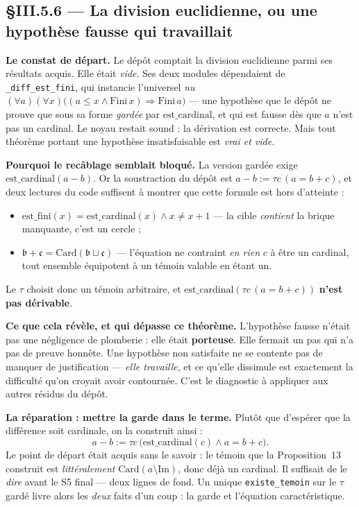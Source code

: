 \subsection{§III.5.6 --- La division euclidienne, ou une hypothèse fausse qui
travaillait}
\label{sec:iii5-division-reparee}

\textbf{Le constat de départ.} Le dépôt comptait la division euclidienne parmi
ses résultats acquis. Elle était \emph{vide}. Ses deux modules dépendaient de
\texttt{\_diff\_est\_fini}, qui instancie l'universel \emph{nu}
$(\forall a)(\forall x)\big((a \le x \wedge \mathrm{Fini}\,x) \Rightarrow
\mathrm{Fini}\,a\big)$ --- une hypothèse que le dépôt ne prouve que sous sa
forme \emph{gardée} par $\mathrm{est\_cardinal}$, et qui est fausse dès que $a$
n'est pas un cardinal. Le noyau restait sound : la dérivation est correcte. Mais
tout théorème portant une hypothèse insatisfaisable est \emph{vrai et vide}.

\textbf{Pourquoi le recâblage semblait bloqué.} La version gardée exige
$\mathrm{est\_cardinal}(a-b)$. Or la soustraction du dépôt est
$a - b := \tau c\,(a = b + c)$, et deux lectures du code suffisent à montrer que
cette formule est hors d'atteinte :
\begin{itemize}
\item $\mathrm{est\_fini}(x) = \mathrm{est\_cardinal}(x) \wedge x \neq x+1$ ---
la cible \emph{contient} la brique manquante, c'est un cercle ;
\item $\mathfrak{b} + \mathfrak{c} = \mathrm{Card}(\mathfrak{b} \sqcup
\mathfrak{c})$ --- l'équation ne contraint \emph{en rien} $c$ à être un
cardinal, tout ensemble équipotent à un témoin valable en étant un.
\end{itemize}
Le $\tau$ choisit donc un témoin arbitraire, et
$\mathrm{est\_cardinal}(\tau c\,(a = b+c))$ \textbf{n'est pas dérivable}.

\textbf{Ce que cela révèle, et qui dépasse ce théorème.} L'hypothèse fausse
n'était pas une négligence de plomberie : elle était \textbf{porteuse}. Elle
fermait un pas qui n'a pas de preuve honnête. Une hypothèse non satisfaite ne se
contente pas de manquer de justification --- \emph{elle travaille}, et ce
qu'elle dissimule est exactement la difficulté qu'on croyait avoir contournée.
C'est le diagnostic à appliquer aux autres résidus du dépôt.

\textbf{La réparation : mettre la garde dans le terme.} Plutôt que d'espérer que
la différence soit cardinale, on la construit ainsi :
\[
a - b := \tau c\,\big(\mathrm{est\_cardinal}(c) \wedge a = b + c\big).
\]
Le point de départ était acquis sans le savoir : le témoin que la Proposition~13
construit est \emph{littéralement} $\mathrm{Card}(a \setminus \mathrm{Im})$, donc
déjà un cardinal. Il suffisait de le \emph{dire} avant le S5 final --- deux
lignes de fond. Un unique \texttt{existe\_temoin} sur le $\tau$ gardé livre alors
les \emph{deux} faits d'un coup : la garde et l'équation caractéristique.

